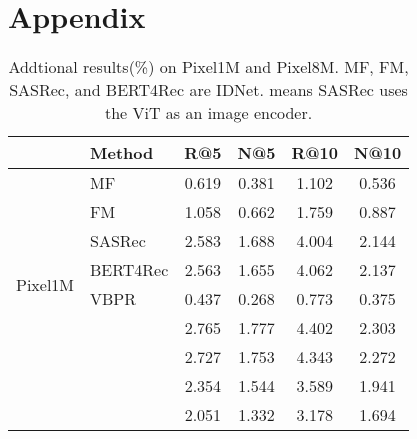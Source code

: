 \documentclass[sigconf]{acmart}
\begin{document}
\vspace{12em}

\appendix

\section{Appendix}

\begin{table}[ht]
	\centering

		\centering
		\caption{Addtional results(\%) on Pixel1M and Pixel8M. MF, FM, SASRec, and BERT4Rec are IDNet.
			 means SASRec uses the ViT as an image encoder.}
		\label{tab:benchmark_large}
		
		\setlength{\tabcolsep}{7pt}
		\begin{tabular}{ll c c c c }
			\toprule
			&Method  & R@5 &  N@5 & R@10 &  N@10    \\
			\midrule
			\multirow{8}{*}{Pixel1M}&MF & 0.619 & 0.381 & 1.102 & 0.536\\
			&FM & 1.058 & 0.662 & 1.759 & 0.887\\ 
			&SASRec & 2.583 & 1.688 & 4.004 & 2.144 \\
			&BERT4Rec & 2.563 & 1.655 & 4.062 & 2.137 \\
			\cmidrule(r){2-6}
			&VBPR& 0.437 & 0.268 & 0.773 & 0.375 \\
			\cmidrule(r){2-6}
			& & 2.765 & 1.777 & 4.402 & 2.303 \\
			& & 2.727 & 1.753 & 4.343 & 2.272  \\	
			\midrule
			\multirow{2}{*}{Pixel8M} 

   & & 2.354 & 1.544 & 3.589 & 1.941 \\
			& & 2.051 & 1.332 & 3.178 & 1.694 \\
			\bottomrule
		\end{tabular}
		\end{table}
\end{document}
